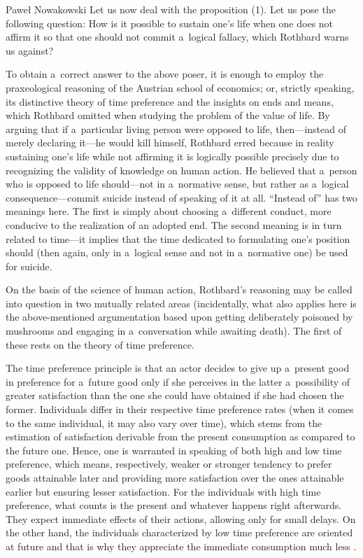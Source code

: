 \begin{artengenv}{Paweł Nowakowski}
Let us now deal with the proposition (1). Let us pose the following question: How is it possible to sustain one's life when one does not affirm it so that one should not commit a~logical fallacy, which Rothbard warns us against?



To obtain a~correct answer to the above poser, it is enough to employ the praxeological reasoning of the Austrian school of economics; or, strictly speaking, its distinctive theory of time preference and the insights on ends and means, which Rothbard omitted when studying the problem of the value of life. By arguing that if a~particular living person were opposed to life, then---instead of merely declaring it---he would kill himself, Rothbard erred because in reality sustaining one's life while not affirming it is logically possible precisely due to recognizing the validity of knowledge on human action. He believed that a~person who is opposed to life should---not in a~normative sense, but rather as a~logical consequence---commit suicide instead of speaking of it at all. ``Instead of'' has two meanings here. The first is simply about choosing a~different conduct, more conducive to the realization of an adopted end. The second meaning is in turn related to time---it implies that the time dedicated to formulating one's position should (then again, only in a~logical sense and not in a~normative one) be used for suicide.



On the basis of the science of human action, Rothbard's reasoning may be called into question in two mutually related areas (incidentally, what also applies here is the above-mentioned argumentation based upon getting deliberately poisoned by mushrooms and engaging in a~conversation while awaiting death). The first of these rests on the theory of time preference.



The time preference principle is that an actor decides to give up a~present good in preference for a~future good only if she perceives in the latter a~possibility of greater satisfaction than the one she could have obtained if she had chosen the former. Individuals differ in their respective time preference rates (when it comes to the same individual, it may also vary over time), which stems from the estimation of satisfaction derivable from the present consumption as compared to the future one. Hence, one is warranted in speaking of both high and low time preference, which means, respectively, weaker or stronger tendency to prefer goods attainable later and providing more satisfaction over the ones attainable earlier but ensuring lesser satisfaction. For the individuals with high time preference, what counts is the present and whatever happens right afterwards. They expect immediate effects of their actions, allowing only for small delays. On the other hand, the individuals characterized by low time preference are oriented at future and that is why they appreciate the immediate consumption much less 
\parencites[see][pp.1–6]{Hoppe2007Democracy}[][pp.478, 481]{Mises2008Human}.%





\end{artengenv}
